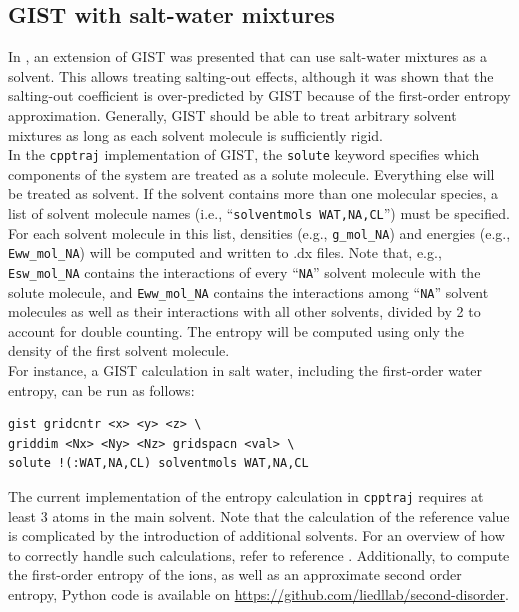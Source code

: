 \documentclass[9pt,tutorial]{livecoms}
\newcommand{\software}{\texttt}
\newcommand\inlinecode{\texttt}
\begin{document}
\subsection{GIST with salt-water mixtures}
\label{sec-salt-water}
In \cite{Waibl2021-gist-salt}, an extension of GIST was presented that can use salt-water mixtures as a solvent.
This allows treating salting-out effects, although it was shown that the salting-out coefficient is over-predicted by GIST because of the first-order entropy approximation.
Generally, GIST should be able to treat arbitrary solvent mixtures as long as each solvent molecule is sufficiently rigid. \\
In the \software{cpptraj} implementation of GIST, the \inlinecode{solute} keyword specifies which components of the system are treated as a solute molecule.
Everything else will be treated as solvent.
If the solvent contains more than one molecular species, a list of solvent molecule names (i.e., ``\inlinecode{solventmols WAT,NA,CL}'') must be specified.
For each solvent molecule in this list, densities (e.g., \inlinecode{g\_mol\_NA}) and energies (e.g., \inlinecode{Eww\_mol\_NA}) will be computed and written to .dx files.
Note that, e.g., \inlinecode{Esw\_mol\_NA} contains the interactions of every ``\inlinecode{NA}'' solvent molecule with the solute molecule, and \inlinecode{Eww\_mol\_NA} contains the interactions among ``\inlinecode{NA}'' solvent molecules as well as their interactions with all other solvents, divided by 2 to account for double counting.
The entropy will be computed using only the density of the first solvent molecule. \\
For instance, a GIST calculation in salt water, including the first-order water entropy, can be run as follows:

\begin{lstlisting}[style=cpptraj]
gist gridcntr <x> <y> <z> \
griddim <Nx> <Ny> <Nz> gridspacn <val> \
solute !(:WAT,NA,CL) solventmols WAT,NA,CL
\end{lstlisting}
The current implementation of the entropy calculation in \software{cpptraj} requires at least 3 atoms in the main solvent.
Note that the calculation of the reference value is complicated by the introduction of additional solvents.
For an overview of how to correctly handle such calculations, refer to reference \cite{Waibl2021-gist-salt}.
Additionally, to compute the first-order entropy of the ions, as well as an approximate second order entropy, Python code is available on \url{https://github.com/liedllab/second-disorder}.
\end{document}
